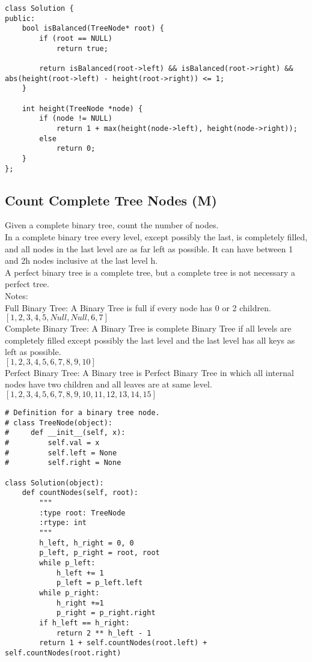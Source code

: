 \begin{lstlisting}
class Solution {
public:
    bool isBalanced(TreeNode* root) {
        if (root == NULL)
            return true;
            
        return isBalanced(root->left) && isBalanced(root->right) && abs(height(root->left) - height(root->right)) <= 1;
    }
    
    int height(TreeNode *node) {
        if (node != NULL)
            return 1 + max(height(node->left), height(node->right));
        else
            return 0;
    }
};
\end{lstlisting}


\subsection{Count Complete Tree Nodes (M)}
Given a complete binary tree, count the number of nodes.\\

In a complete binary tree every level, except possibly the last, is completely filled, and all nodes in the last level are as far left as possible. It can have between 1 and 2h nodes inclusive at the last level h.\\

A perfect binary tree is a complete tree, but a complete tree is not necessary a perfect tree.\\

Notes: \\
Full Binary Tree: A Binary Tree is full if every node has 0 or 2 children. \\
$[1, 2, 3, 4, 5, Null, Null, 6, 7]$ \\

Complete Binary Tree: A Binary Tree is complete Binary Tree if all levels are completely filled except possibly the last level and the last level has all keys as left as possible.\\
$[1, 2, 3, 4, 5, 6, 7, 8, 9, 10]$ \\


Perfect Binary Tree: A Binary tree is Perfect Binary Tree in which all internal nodes have two children and all leaves are at same level.\\
$[1, 2, 3, 4, 5, 6, 7, 8, 9, 10, 11, 12, 13, 14, 15]$ \\


\begin{lstlisting}
# Definition for a binary tree node.
# class TreeNode(object):
#     def __init__(self, x):
#         self.val = x
#         self.left = None
#         self.right = None

class Solution(object):
    def countNodes(self, root):
        """
        :type root: TreeNode
        :rtype: int
        """
        h_left, h_right = 0, 0
        p_left, p_right = root, root
        while p_left:
            h_left += 1
            p_left = p_left.left
        while p_right:
            h_right +=1
            p_right = p_right.right
        if h_left == h_right:
            return 2 ** h_left - 1
        return 1 + self.countNodes(root.left) + self.countNodes(root.right)
\end{lstlisting}

